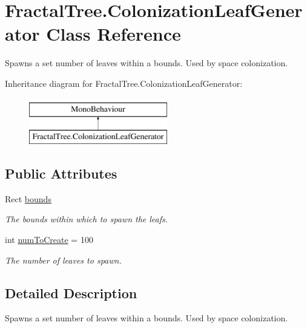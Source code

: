 \hypertarget{class_fractal_tree_1_1_colonization_leaf_generator}{}\section{Fractal\+Tree.\+Colonization\+Leaf\+Generator Class Reference}
\label{class_fractal_tree_1_1_colonization_leaf_generator}


Spawns a set number of leaves within a bounds. Used by space colonization.  


Inheritance diagram for Fractal\+Tree.\+Colonization\+Leaf\+Generator\+:\begin{figure}[H]
\begin{center}
\leavevmode
\includegraphics[height=2.000000cm]{class_fractal_tree_1_1_colonization_leaf_generator}
\end{center}
\end{figure}
\subsection*{Public Attributes}
\begin{DoxyCompactItemize}
\item 
Rect \hyperlink{class_fractal_tree_1_1_colonization_leaf_generator_aa9755eb054a0654d8eb9a03e8d4db0dd}{bounds}
\begin{DoxyCompactList}\small\item\em The bounds within which to spawn the leafs. \end{DoxyCompactList}\item 
int \hyperlink{class_fractal_tree_1_1_colonization_leaf_generator_a8c80eb30ad9f225f5e5d146f8b633e0c}{num\+To\+Create} = 100
\begin{DoxyCompactList}\small\item\em The number of leaves to spawn. \end{DoxyCompactList}\end{DoxyCompactItemize}


\subsection{Detailed Description}
Spawns a set number of leaves within a bounds. Used by space colonization. 



